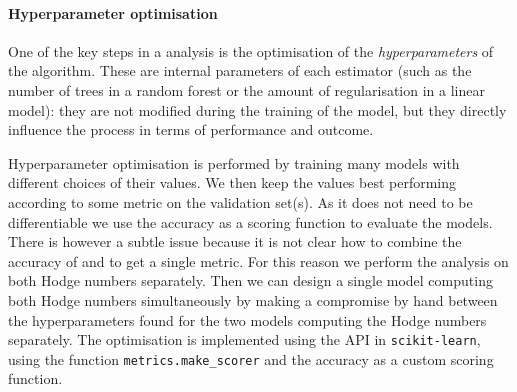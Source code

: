 \paragraph{Hyperparameter optimisation}

One of the key steps in a \ml analysis is the optimisation of the \emph{hyperparameters} of the algorithm.
These are internal parameters of each estimator (such as the number of trees in a random forest or the amount of regularisation in a linear model): they are not modified during the training of the model, but they directly influence the process in terms of performance and outcome.

Hyperparameter optimisation is performed by training many models with different choices of their values.
We then keep the values best performing according to some metric on the validation set(s).\footnotemark{}
As it does not need to be differentiable we use the accuracy as a scoring function to evaluate the models.
There is however a subtle issue because it is not clear how to combine the accuracy of  and  to get a single metric.
For this reason we perform the analysis on both Hodge numbers separately.
Then we can design a single model computing both Hodge numbers simultaneously by making a compromise by hand between the hyperparameters found for the two models computing the Hodge numbers separately.
The optimisation is implemented using the API in \texttt{scikit-learn}, using the function \texttt{metrics.make\_scorer} and the accuracy as a custom scoring function.

